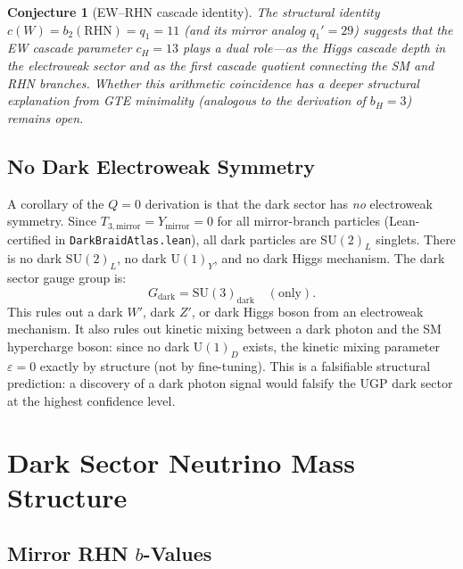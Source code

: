 \documentclass[11pt]{article}
\newtheorem{conjecture}[theorem]{Conjecture}
\begin{document}
\begin{conjecture}[EW--RHN cascade identity]
\label{conj:ew_rhn_cascade}
The structural identity $c(W) = b_2(\mathrm{RHN}) = q_1 = 11$ (and its mirror analog
$q_1' = 29$) suggests that the EW cascade parameter $c_H = 13$ plays a dual role---as
the Higgs cascade depth in the electroweak sector and as the first cascade quotient
connecting the SM and RHN branches. Whether this arithmetic coincidence has a deeper
structural explanation from GTE minimality (analogous to the derivation of $b_H = 3$)
remains open.
\end{conjecture}

\subsection{No Dark Electroweak Symmetry}
\label{ssec:dark_ew}

A corollary of the $Q=0$ derivation is that the dark sector has \emph{no} electroweak
symmetry. Since $T_{3,\mathrm{mirror}} = Y_\mathrm{mirror} = 0$ for all mirror-branch
particles (Lean-certified in \texttt{DarkBraidAtlas.lean}), all dark particles are
$\mathrm{SU}(2)_L$ singlets. There is no dark $\mathrm{SU}(2)_L$, no dark $\mathrm{U}(1)_Y$,
and no dark Higgs mechanism. The dark sector gauge group is:
\begin{equation}
G_\mathrm{dark} = \mathrm{SU}(3)_\mathrm{dark} \quad (\text{only}).
\label{eq:dark_gauge}
\end{equation}
This rules out a dark $W'$, dark $Z'$, or dark Higgs boson from an electroweak mechanism.
It also rules out kinetic mixing between a dark photon and the SM hypercharge boson:
since no dark $\mathrm{U}(1)_D$ exists, the kinetic mixing parameter $\varepsilon = 0$
exactly by structure (not by fine-tuning). This is a falsifiable structural prediction:
a discovery of a dark photon signal would falsify the UGP dark sector at the highest
confidence level.

\section{Dark Sector Neutrino Mass Structure}
\label{sec:dark_nu}

\subsection{Mirror RHN $b$-Values}
\label{ssec:mirror_b_values}
\end{document}
